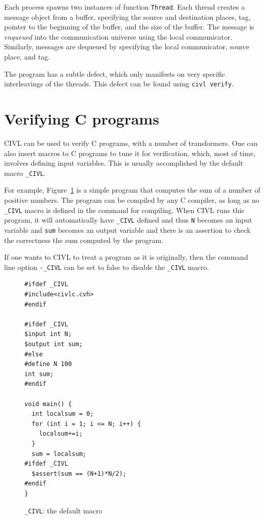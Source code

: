 Each process spawns two instances of function \texttt{Thread}.  Each
thread creates a message object from a buffer, specifying the source
and destination places, tag, pointer to the beginning of the buffer,
and the size of the buffer.  The message is \emph{enqueued} into the
communication universe using the local communicator.  Similarly,
messages are dequeued by specifying the local communicator, source
place, and tag.

The program has a subtle defect, which only manifests on very specific
interleavings of the threads.   This defect can be found using
\texttt{civl verify}.

\section{Verifying C programs}
CIVL can be used to verify C programs, with a number of transformers. One can also insert macros to C programs to tune it for verification, which, most of time, involves defining input variables. This is usually accomplished by the default macro \texttt{\_CIVL}.

For example, Figure~\ref{fig:CIVLmacro} is a simple program that computes the sum of a number of positive numbers. The program can be compiled by any C compiler, as long as no \texttt{\_CIVL} macro is defined in the command for compiling. When CIVL runs this program, it will automatically have \texttt{\_CIVL} defined and thus \texttt{N} becomes an input variable and \texttt{sum} becomes an output variable and there is an assertion to check the correctness the sum computed by the program. 

If one wants to CIVL to treat a program as it is originally, then the command line option \texttt{-\_CIVL} can be set to false to disable the \texttt{\_CIVL} macro.

\begin{figure}[h]
\begin{small}
\begin{verbatim}
#ifdef _CIVL
#include<civlc.cvh>
#endif

#ifdef _CIVL
$input int N;
$output int sum;
#else
#define N 100
int sum;
#endif

void main() {
  int localsum = 0;
  for (int i = 1; i <= N; i++) {
    localsum+=i;
  } 
  sum = localsum;
#ifdef _CIVL
  $assert(sum == (N+1)*N/2);
#endif
}

\end{verbatim}
  \end{small}
  \caption{\texttt{\_CIVL}: the default macro}
  \label{fig:CIVLmacro}
\end{figure}


